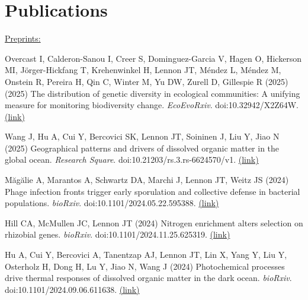 \documentclass[11pt]{article}
\begin{document}
\section*{Publications}
\vspace{-0.25em} %
\begin{etaremune}

\item[] \textnormal{\underline{Preprints:}}


\item Overcast I, Calderon-Sanou I, Creer S, Dominguez-Garcia V, Hagen O, Hickerson MI, Jörger-Hickfang T, Krehenwinkel H, Lennon JT, Méndez L, Méndez M, Onstein R, Pereira H, Qin C, Winter M, Yu DW, Zurell D, Gillespie R (2025)  (2025) The distribution of genetic diversity in ecological communities: A unifying measure for monitoring biodiversity change. \textit{EcoEvoRxiv}. doi:10.32942/X2Z64W. \href{https://ecoevorxiv.org/repository/view/9169/}{(link)}

\item Wang J, Hu A, Cui Y, Bercovici SK, Lennon JT, Soininen J, Liu Y, Jiao N (2025) Geographical patterns and drivers of dissolved organic matter in the global ocean. \textit{Research Square}. doi:10.21203/rs.3.rs-6624570/v1. \href{https://assets-eu.researchsquare.com/files/rs-6624570/v1/a75822e6-0649-4c95-919e-3ba016f0bc96.pdf?c=1747022553}{(link)}

\item Măgălie A, Marantos A, Schwartz DA, Marchi J, Lennon JT, Weitz JS (2024) Phage infection fronts trigger early sporulation and collective defense in bacterial populations. \textit{bioRxiv}. doi:10.1101/2024.05.22.595388. \href{https://www.biorxiv.org/content/10.1101/2024.05.22.595388v1.full.pdf}{(link)}

\item Hill CA, McMullen JC, Lennon JT (2024) Nitrogen enrichment alters selection on rhizobial genes. \textit{bioRxiv}. doi:10.1101/2024.11.25.625319. \href{https://www.biorxiv.org/content/10.1101/2024.11.25.625319v1.full.pdf}{(link)}

\item Hu A, Cui Y, Bercovici A, Tanentzap AJ, Lennon JT, Lin X, Yang Y, Liu Y, Osterholz H, Dong H, Lu Y, Jiao N, Wang J (2024) Photochemical processes drive thermal responses of dissolved organic matter in the dark ocean. \textit{bioRxiv}. doi:10.1101/2024.09.06.611638. \href{https://www.biorxiv.org/content/10.1101/2024.09.06.611638v1.full.pdf}{(link)}


\end{etaremune}
\end{document}
